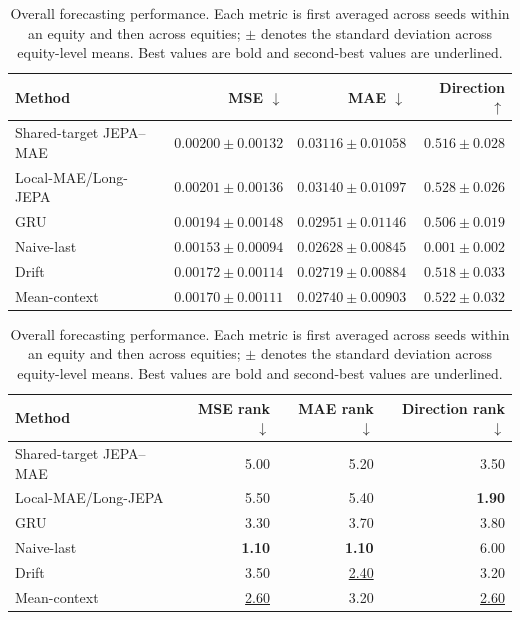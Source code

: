 \begin{table}[t]
\centering
\small
\caption{Overall forecasting performance. Each metric is first averaged across seeds within an equity and then across equities; $\pm$ denotes the standard deviation across equity-level means. Best values are bold and second-best values are underlined.}
\label{tab:main_metrics}
\begin{tabular}{lrrr}
\toprule
Method & MSE $\downarrow$ & MAE $\downarrow$ & Direction $\uparrow$ \\
\midrule
Shared-target JEPA--MAE & $0.00200 \pm 0.00132$ & $0.03116 \pm 0.01058$ & $0.516 \pm 0.028$ \\
Local-MAE/Long-JEPA & $0.00201 \pm 0.00136$ & $0.03140 \pm 0.01097$ & \textbf{$0.528 \pm 0.026$} \\
GRU & $0.00194 \pm 0.00148$ & $0.02951 \pm 0.01146$ & $0.506 \pm 0.019$ \\
Naive-last & \textbf{$0.00153 \pm 0.00094$} & \textbf{$0.02628 \pm 0.00845$} & $0.001 \pm 0.002$ \\
Drift & $0.00172 \pm 0.00114$ & \underline{$0.02719 \pm 0.00884$} & $0.518 \pm 0.033$ \\
Mean-context & \underline{$0.00170 \pm 0.00111$} & $0.02740 \pm 0.00903$ & \underline{$0.522 \pm 0.032$} \\
\bottomrule
\end{tabular}
\par\medskip
\begin{tabular}{lrrr}
\toprule
Method & MSE rank $\downarrow$ & MAE rank $\downarrow$ & Direction rank $\downarrow$ \\
\midrule
Shared-target JEPA--MAE & 5.00 & 5.20 & 3.50 \\
Local-MAE/Long-JEPA & 5.50 & 5.40 & \textbf{1.90} \\
GRU & 3.30 & 3.70 & 3.80 \\
Naive-last & \textbf{1.10} & \textbf{1.10} & 6.00 \\
Drift & 3.50 & \underline{2.40} & 3.20 \\
Mean-context & \underline{2.60} & 3.20 & \underline{2.60} \\
\bottomrule
\end{tabular}
\end{table}
